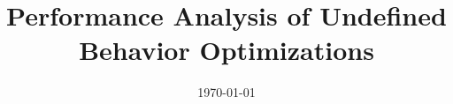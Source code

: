 \documentclass[12pt]{article}
\begin{document}
\title{Performance Analysis of Undefined Behavior Optimizations}

\date{\today}

\maketitle






\end{document}
